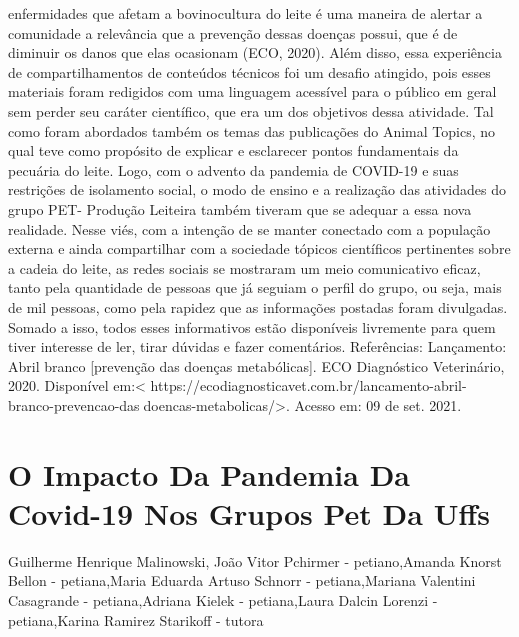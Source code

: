 enfermidades que afetam a bovinocultura do leite é uma maneira de alertar a comunidade a 
relevância que a prevenção dessas doenças possui, que é de diminuir os danos que elas ocasionam 
(ECO, 2020). 
Além disso, essa experiência de compartilhamentos de conteúdos técnicos foi um 
desafio atingido, pois esses materiais foram redigidos com uma linguagem acessível para o público 
em geral sem perder seu caráter científico, que era um dos objetivos dessa atividade. Tal como 
foram abordados também os temas das publicações do Animal Topics, no qual teve como 
propósito de explicar e esclarecer pontos fundamentais da pecuária do leite.
Logo, com o advento da pandemia de COVID-19 e suas restrições de isolamento 
social, o modo de ensino e a realização das atividades do grupo PET- Produção Leiteira também 
tiveram que se adequar a essa nova realidade. Nesse viés, com a intenção de se manter conectado 
com a população externa e ainda compartilhar com a sociedade tópicos científicos pertinentes 
sobre a cadeia do leite, as redes sociais se mostraram um meio comunicativo eficaz, tanto pela 
quantidade de pessoas que já seguiam o perfil do grupo, ou seja, mais de mil pessoas, como pela 
rapidez que as informações postadas foram divulgadas. Somado a isso, todos esses informativos 
estão disponíveis livremente para quem tiver interesse de ler, tirar dúvidas e fazer comentários. 
Referências:
Lançamento: Abril branco [prevenção das doenças metabólicas]. ECO Diagnóstico Veterinário, 
2020. Disponível em:< https://ecodiagnosticavet.com.br/lancamento-abril-branco-prevencao-dasdoencas-metabolicas/>. Acesso em: 09 de set. 2021.




\section*{O Impacto Da Pandemia Da Covid-19 Nos Grupos Pet Da Uffs}

Guilherme Henrique Malinowski, João Vitor Pchirmer - petiano,Amanda Knorst Bellon - petiana,Maria Eduarda Artuso Schnorr - petiana,Mariana Valentini Casagrande - petiana,Adriana Kielek - petiana,Laura Dalcin Lorenzi - petiana,Karina Ramirez Starikoff - tutora

